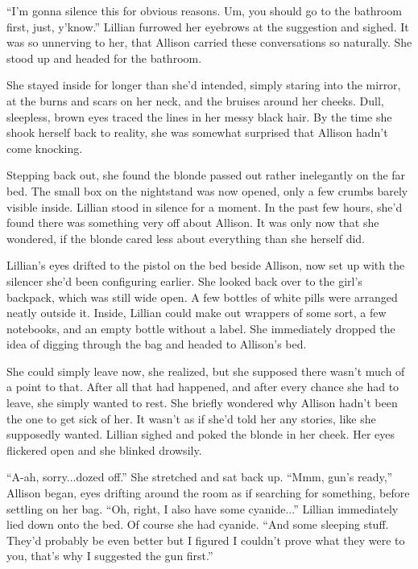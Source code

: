 \begin{Standard}
``I'm gonna silence this for obvious reasons. Um, you should go to the bathroom first,
just, y'know.'' Lillian furrowed her eyebrows at the suggestion and sighed. It was
so unnerving to her, that Allison carried these conversations so naturally. She stood up
and headed for the bathroom.

She stayed inside for longer than she'd intended, simply staring into the mirror, at the
burns and scars on her neck, and the bruises around her cheeks. Dull, sleepless, brown eyes
traced the lines in her messy black hair. By the time she shook herself back to reality, she
was somewhat surprised that Allison hadn't come knocking.

Stepping back out, she found the blonde passed out rather inelegantly on the far bed.
The small box on the nightstand was now opened, only a few crumbs barely visible inside.
Lillian stood in silence for a moment. In the past few hours, she'd found there
was something very off about Allison. It was only now that she wondered, if the blonde
cared less about everything than she herself did.

Lillian's eyes drifted to the pistol on the bed beside Allison, now set up with
the silencer she'd been configuring earlier. She looked back over to the girl's
backpack, which was still wide open. A few bottles of white pills were arranged
neatly outside it. Inside, Lillian could make out wrappers of some sort, a few notebooks,
and an empty bottle without a label. She immediately dropped the idea of digging
through the bag and headed to Allison's bed.

She could simply leave now, she realized, but she supposed there wasn't much of a
point to that. After all that had happened, and after every chance she had to leave,
she simply wanted to rest. She briefly wondered why Allison hadn't been the one to get sick
of her. It wasn't as if she'd told her any stories, like she supposedly wanted. Lillian
sighed and poked the blonde in her cheek. Her eyes flickered open and she blinked drowsily.

``A-ah, sorry...dozed off.'' She stretched and sat back up. ``Mmm, gun's ready,'' Allison
began, eyes drifting around the room as if searching for something, before settling on
her bag. ``Oh, right, I also have some cyanide...'' Lillian immediately lied down
onto the bed. Of course she had cyanide. ``And some sleeping stuff. They'd probably
be even better but I figured I couldn't prove what they were to you, that's why
I suggested the gun first.''


\end{Standard}
